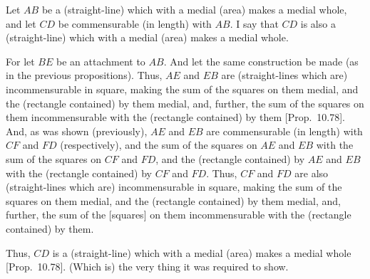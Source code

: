 \begin{Parallel}{}{}
{Let $AB$ be a (straight-line) which with a medial (area) makes a medial
whole, and let $CD$ be commensurable (in length) with $AB$.
I say that $CD$ is also a (straight-line) which with a medial (area) makes
a medial whole.

For let $BE$ be an attachment to $AB$. And let the same
construction be made (as in the previous propositions). Thus,
$AE$ and $EB$ are (straight-lines which are) incommensurable in square, making
the sum of the squares on them medial, and the (rectangle contained)
by them medial, and, further, the sum of the squares on them incommensurable with the (rectangle contained) by them [Prop.~10.78].  And, as was shown (previously),
$AE$ and $EB$ are commensurable (in length) with $CF$ and $FD$ (respectively),
and the sum of the squares on $AE$ and $EB$ with the sum of the squares on
$CF$ and $FD$, and the (rectangle contained) by $AE$ and $EB$ with
the (rectangle contained) by $CF$ and $FD$. Thus, $CF$ and
$FD$ are also (straight-lines which are) incommensurable in square, making the sum of the squares on
them medial, and the (rectangle contained) by them medial, and, further,
the sum of the [squares] on them incommensurable with the (rectangle
contained) by them.

Thus, $CD$ is a (straight-line) which with a medial (area) makes a medial
whole [Prop.~10.78]. (Which is) the very thing
it was required to show.}
\end{Parallel}

